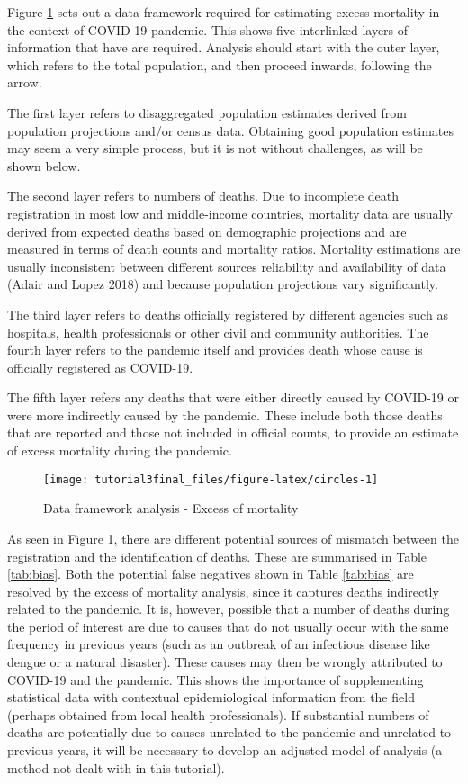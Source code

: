 \documentclass[
]{article}
\begin{document}
Figure \ref{fig:circles} sets out a data framework required for estimating excess mortality in the context of COVID-19 pandemic. This shows five interlinked layers of information that have are required. Analysis should start with the outer layer, which refers to the total population, and then proceed inwards, following the arrow.

The first layer refers to disaggregated population estimates derived from population projections and/or census data. Obtaining good population estimates may seem a very simple process, but it is not without challenges, as will be shown below.

The second layer refers to numbers of deaths. Due to incomplete death registration in most low and middle-income countries, mortality data are usually derived from expected deaths based on demographic projections and are measured in terms of death counts and mortality ratios. Mortality estimations are usually inconsistent between different sources reliability and availability of data (Adair and Lopez 2018) and because population projections vary significantly.

The third layer refers to deaths officially registered by different agencies such as hospitals, health professionals or other civil and community authorities.
The fourth layer refers to the pandemic itself and provides death whose cause is officially registered as COVID-19.

The fifth layer refers any deaths that were either directly caused by COVID-19 or were more indirectly caused by the pandemic. These include both those deaths that are reported and those not included in official counts, to provide an estimate of excess mortality during the pandemic.

\begin{figure}[H]

{\centering \texttt{[image: tutorial3final\_files/figure-latex/circles-1]} 

}

\caption{Data framework analysis - Excess of mortality}\label{fig:circles}
\end{figure}

As seen in Figure \ref{fig:circles}, there are different potential sources of mismatch between the registration and the identification of deaths. These are summarised in Table \ref{tab:bias}. Both the potential false negatives shown in Table \ref{tab:bias} are resolved by the excess of mortality analysis, since it captures deaths indirectly related to the pandemic. It is, however, possible that a number of deaths during the period of interest are due to causes that do not usually occur with the same frequency in previous years (such as an outbreak of an infectious disease like dengue or a natural disaster). These causes may then be wrongly attributed to COVID-19 and the pandemic. This shows the importance of supplementing statistical data with contextual epidemiological information from the field (perhaps obtained from local health professionals). If substantial numbers of deaths are potentially due to causes unrelated to the pandemic and unrelated to previous years, it will be necessary to develop an adjusted model of analysis (a method not dealt with in this tutorial).
\end{document}
